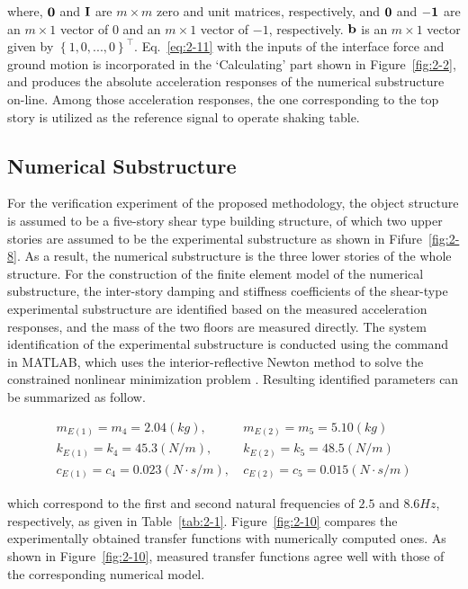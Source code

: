 where, $\mathbf{0}$ and $\mathbf{I}$ are $m \times m$ zero and unit matrices, respectively, and $\mathbf{0}$ and $\mathbf{-1}$ are an $m \times 1$ vector of $0$ and an $m \times 1$ vector of $-1$, respectively. $\mathbf{b}$ is an $m \times 1$ vector given by $\left\{1, 0, ..., 0 \right\}^{\top}$. Eq.~\eqref{eq:2-11} with the inputs of the interface force and ground motion is incorporated in the `Calculating' part shown in Figure~\ref{fig:2-2}, and produces the absolute acceleration responses of the numerical substructure on-line. Among those acceleration responses, the one corresponding to the top story is utilized as the reference signal to operate shaking table.

\subsection{Numerical Substructure}
For the verification experiment of the proposed methodology, the object structure is assumed to be a five-story shear type building structure, of which two upper stories are assumed to be the experimental substructure as shown in Fifure~\ref{fig:2-8}. As a result, the numerical substructure is the three lower stories of the whole structure. For the construction of the finite element model of the numerical substructure, the inter-story damping and stiffness coefficients of the shear-type experimental substructure are identified based on the measured acceleration responses, and the mass of the two floors are measured directly. The system identification of the experimental substructure is conducted using the command  in MATLAB\citep{coleman1999optimization}, which uses the interior-reflective Newton method to solve the constrained nonlinear minimization problem \citep{coleman1994convergence,coleman1996interior}. Resulting identified parameters can be summarized as follow.

\begin{equation}\label{eq:2-18}
\begin{aligned}
m_{E(1)}=m_{4}=2.04(kg),~& m_{E(2)}=m_{5}=5.10(kg)\\
k_{E(1)}=k_{4}=45.3(N/m),~& k_{E(2)}=k_{5}=48.5(N/m)\\
c_{E(1)}=c_{4}=0.023(N\cdot s/m),~&c_{E(2)}=c_{5}=0.015(N\cdot s/m)
\end{aligned}
\end{equation}

which correspond to the first and second natural frequencies of $2.5$ and $8.6Hz$, respectively, as given in Table~\ref{tab:2-1}. Figure~\ref{fig:2-10} compares the experimentally obtained transfer functions with numerically computed ones. As shown in Figure~\ref{fig:2-10}, measured transfer functions agree well with those of the corresponding numerical model.

